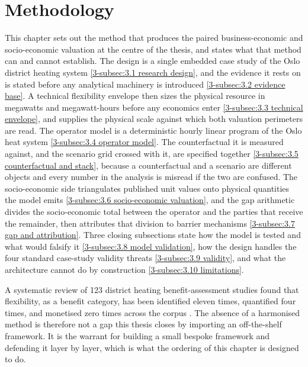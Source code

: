 \section{Methodology}
\label{3-sec:3}

This chapter sets out the method that produces the paired business-economic and socio-economic valuation at the centre of the thesis, and states what that method can and cannot establish. The design is a single embedded case study of the Oslo district heating system \autoref{3-subsec:3.1 research design}, and the evidence it rests on is stated before any analytical machinery is introduced \autoref{3-subsec:3.2 evidence base}. A technical flexibility envelope then sizes the physical resource in megawatts and megawatt-hours before any economics enter \autoref{3-subsec:3.3 technical envelope}, and supplies the physical scale against which both valuation perimeters are read. The operator model is a deterministic hourly linear program of the Oslo heat system \autoref{3-subsec:3.4 operator model}. The counterfactual it is measured against, and the scenario grid crossed with it, are specified together \autoref{3-subsec:3.5 counterfactual and stack}, because a counterfactual and a scenario are different objects and every number in the analysis is misread if the two are confused. The socio-economic side triangulates published unit values onto physical quantities the model emits \autoref{3-subsec:3.6 socio-economic valuation}, and the gap arithmetic divides the socio-economic total between the operator and the parties that receive the remainder, then attributes that division to barrier mechanisms \autoref{3-subsec:3.7 gap and attribution}. Three closing subsections state how the model is tested and what would falsify it \autoref{3-subsec:3.8 model validation}, how the design handles the four standard case-study validity threats \autoref{3-subsec:3.9 validity}, and what the architecture cannot do by construction \autoref{3-subsec:3.10 limitations}.

A systematic review of 123 district heating benefit-assessment studies found that flexibility, as a benefit category, has been identified eleven times, quantified four times, and monetised zero times across the corpus \cite{ahmed_district_2025}. The absence of a harmonised method is therefore not a gap this thesis closes by importing an off-the-shelf framework. It is the warrant for building a small bespoke framework and defending it layer by layer, which is what the ordering of this chapter is designed to do.

